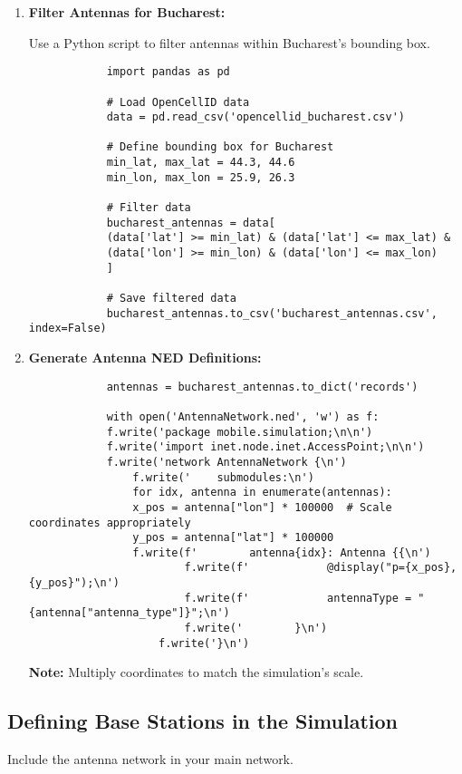 \documentclass{article}
\begin{document}
	\begin{enumerate}
		\item \textbf{Filter Antennas for Bucharest:}
		
		Use a Python script to filter antennas within Bucharest's bounding box.
		
		\begin{verbatim}
			import pandas as pd
			
			# Load OpenCellID data
			data = pd.read_csv('opencellid_bucharest.csv')
			
			# Define bounding box for Bucharest
			min_lat, max_lat = 44.3, 44.6
			min_lon, max_lon = 25.9, 26.3
			
			# Filter data
			bucharest_antennas = data[
			(data['lat'] >= min_lat) & (data['lat'] <= max_lat) &
			(data['lon'] >= min_lon) & (data['lon'] <= max_lon)
			]
			
			# Save filtered data
			bucharest_antennas.to_csv('bucharest_antennas.csv', index=False)
		\end{verbatim}
		
		\item \textbf{Generate Antenna NED Definitions:}
		
		\begin{verbatim}
			antennas = bucharest_antennas.to_dict('records')
			
			with open('AntennaNetwork.ned', 'w') as f:
			f.write('package mobile.simulation;\n\n')
			f.write('import inet.node.inet.AccessPoint;\n\n')
			f.write('network AntennaNetwork {\n')
				f.write('    submodules:\n')
				for idx, antenna in enumerate(antennas):
				x_pos = antenna["lon"] * 100000  # Scale coordinates appropriately
				y_pos = antenna["lat"] * 100000
				f.write(f'        antenna{idx}: Antenna {{\n')
						f.write(f'            @display("p={x_pos},{y_pos}");\n')
						f.write(f'            antennaType = "{antenna["antenna_type"]}";\n')
						f.write('        }\n')
					f.write('}\n')
			\end{verbatim}
			
			\textbf{Note:} Multiply coordinates to match the simulation's scale.
			
		\end{enumerate}
		
		\subsection{Defining Base Stations in the Simulation}
		
		Include the antenna network in your main network.
		
\end{document}
